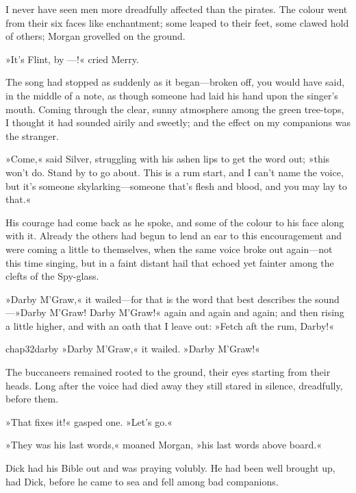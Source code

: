I never have seen men more dreadfully affected than the pirates. The colour went from their six faces like enchantment; some leaped to their feet, some clawed hold of others; Morgan grovelled on the ground.

»It's Flint, by —!« cried Merry.

The song had stopped as suddenly as it began—broken off, you would have said, in the middle of a note, as though someone had laid his hand upon the singer's mouth. Coming through the clear, sunny atmosphere among the green tree-tops, I thought it had sounded airily and sweetly; and the effect on my companions was the stranger.

»Come,« said Silver, struggling with his ashen lips to get the word out; »this won't do. Stand by to go about. This is a rum start, and I can't name the voice, but it's someone skylarking—someone that's flesh and blood, and you may lay to that.«

His courage had come back as he spoke, and some of the colour to his face along with it. Already the others had begun to lend an ear to this encouragement and were coming a little to themselves, when the same voice broke out again—not this time singing, but in a faint distant hail that echoed yet fainter among the clefts of the Spy-glass.

»Darby M'Graw,« it wailed—for that is the word that best describes the sound—»Darby M'Graw! Darby M'Graw!« again and again and again; and then rising a little higher, and with an oath that I leave out: »Fetch aft the rum, Darby!«


\begin{bwbigpic}
	[\picsize]
	{chap32darby}
	{»Darby M'Graw,« it wailed. »Darby M'Graw!«}
\end{bwbigpic}

The buccaneers remained rooted to the ground, their eyes starting from their heads. Long after the voice had died away they still stared in silence, dreadfully, before them.

»That fixes it!« gasped one. »Let's go.«

»They was his last words,« moaned Morgan, »his last words above board.«

Dick had his Bible out and was praying volubly. He had been well brought up, had Dick, before he came to sea and fell among bad companions.


